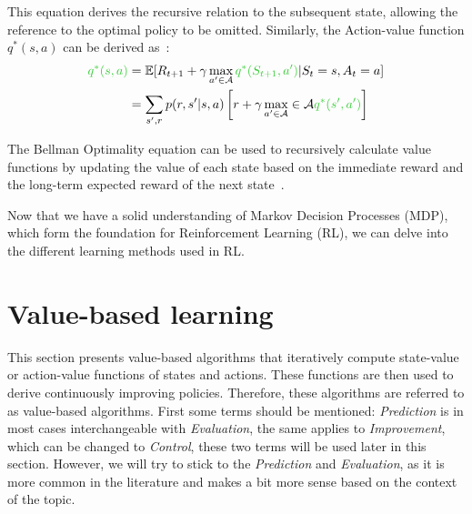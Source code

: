 \documentclass[../xlapes02]{subfiles}
\begin{document}
    This equation derives the recursive relation to the subsequent state, allowing the reference to the optimal policy to be omitted. Similarly, the Action-value function $q^*(s, a)$ can be derived as~\cite{rao2022foundations}:
    \begin{equation}
        \begin{split}
            \textcolor[RGB]{51,204,51}{q^*(s, a)} &= \mathbb{E}[R_{t+1} + \gamma \max_{a'\in\mathcal{A}} \textcolor[RGB]{51,204,51}{q^*(S_{t+1}, a')} | S_t = s, A_t = a] \\
            &= \sum_{s', r} p(r, s'|s, a) \left[r + \gamma \max_{a'\in\mathcal{A}} \in \mathcal{A} \textcolor[RGB]{51,204,51}{q^*(s', a')}  \right]
        \end{split}
    \end{equation}


    The Bellman Optimality equation can be used to recursively calculate value functions by updating the value of each state based on the immediate reward and the long-term expected reward of the next state~\cite{rao2022foundations}.

    Now that we have a solid understanding of Markov Decision Processes (MDP), which form the foundation for Reinforcement Learning (RL), we can delve into the different learning methods used in RL.


    \section{Value-based learning}\label{sec:value-based-learning}
    This section presents value-based algorithms that iteratively compute state-value or action-value functions of states and actions. These functions are then used to derive continuously improving policies. Therefore, these algorithms are referred to as value-based algorithms. First some terms should be mentioned: \emph{Prediction} is in most cases interchangeable with \emph{Evaluation}, the same applies to \emph{Improvement}, which can be changed to \emph{Control}, these two terms will be used later in this section. However, we will try to stick to the \emph{Prediction} and \emph{Evaluation}, as it is more common in the literature and makes a bit more sense based on the context of the topic.
\end{document}
